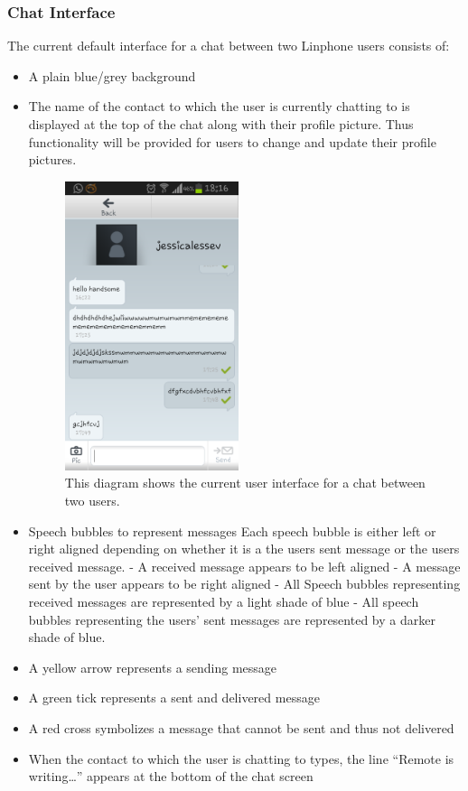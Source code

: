 \documentclass[11pt]{article}
\begin{document}
\subsubsection{Chat Interface}
The current default interface for a chat between two Linphone users consists of:
\begin{itemize}
\item	A plain blue/grey background
\item	The name of the contact to which the user is currently chatting to is displayed at the top of the chat along with their profile picture.
\subitem Thus functionality will be provided for users to change and update their profile pictures.
\begin{figure}[H]
\centering
\includegraphics[width=2in]{./images/screen.png}
\caption[Sample Chat Screen]{This diagram shows the current user interface for a chat between two users.}
\label{cd-chat-interface}
\end{figure}
\item	Speech bubbles to represent messages
\subitem	Each speech bubble is either left or right aligned depending on whether it is a the users sent message or the users received message.
\subitem	- A received message appears to be left aligned
\subitem	- A message sent by the user appears to be right aligned
\subitem	- All Speech bubbles representing received messages are represented by a light shade of blue
\subitem	- All speech bubbles representing the users' sent messages are represented by a darker shade of blue.
\item	A yellow arrow represents a sending message
\item	A green tick represents a sent and delivered message
\item	A red cross symbolizes a message that cannot be sent and thus not delivered
\item	When the contact to which the user is chatting to types, the line “Remote is writing…” appears at the bottom of the chat screen

\end{itemize}
\end{document}
